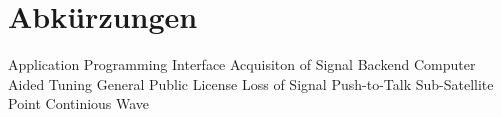 
\chapter*{Abkürzungen}

\begin{acronym}[GPL123]	%
	 {Application Programming Interface}	
	 {Acquisiton of Signal}
	  {Backend}
	 {Computer Aided Tuning}
	 {General Public License}
	 {Loss of Signal}
	 {Push-to-Talk}
	 {Sub-Satellite Point}
	  {Continious Wave}
\end{acronym}

\clearpage
